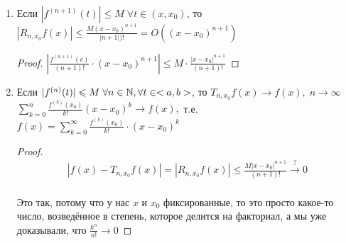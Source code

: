 \begin{follow}
    \begin{enumerate}
        \item Если $|f^{(n+1)}(t)| \leqslant M \; \forall t \in (x, x_0)$, то $|R_{n, x_0}f(x)| \leqslant \frac{M(x-x_0)^{n + 1}}{|n+1|)!} = O((x - x_0)^{n + 1})$
            \begin{proof}
                $| \frac{f^{(n+1)}(c)}{(n+1)!} \cdot (x - x_0)^{n+1} | \leqslant M \cdot \frac{|x-x_0|^{n+1}}{(n+1)!}$
            \end{proof}
        \item
        Если \; $|f^{(n)}(t)| \leqslant M \; \forall n \in \mathbb{N}, \forall t \in <a, b>$, то \; $T_{n,x_0}f(x) \rightarrow f(x), \; n \rightarrow \infty$ \\

        $\sum_{k=0}^{n} \frac{f^{(k)}(x_0)}{k!} (x - x_0)^k \rightarrow f(x),$ т.е. $f(x) = \sum_{k=0}^{\infty} \frac{f^{(k)}(x_0)}{k!} \cdot (x - x_0)^k$
            \begin{proof}

                \begin{gather*}
                    |f(x) - T_{n,x_0}f(x)| = |R_{n, x_0} f(x)| \leqslant \frac{M|x-x_0|^{n+1}}{(n+1)!} \stackrel{?}{\rightarrow} 0 \\
                \end{gather*}

                Это так, потому что у нас $x$ и $x_0$ фиксированные, то это просто какое-то число, возведённое в степень, которое делится на факториал, а мы
                уже доказывали, что $\frac{k^n}{n!} \rightarrow 0$

            \end{proof}
    \end{enumerate}
\end{follow}